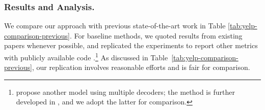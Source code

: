 \documentclass[letterpaper]{article} %
\begin{document}
\subsubsection{Results and Analysis.}

We compare our approach with previous state-of-the-art work in Table \ref{tab:yelp-comparison-previous}.
For baseline methods, we quoted results from existing papers whenever possible, and replicated the experiments to report other metrics with publicly available code \cite{shen2017style,fu2018style,zhao2018adversarially}.\footnote{\citet{fu2018style} propose another model using multiple decoders; the method is further developed in \citet{zhao2018adversarially}, and we adopt the latter for comparison.} As discussed in Table~\ref{tab:yelp-comparison-previous}, our replication involves reasonable efforts and is fair for comparison.
\end{document}

